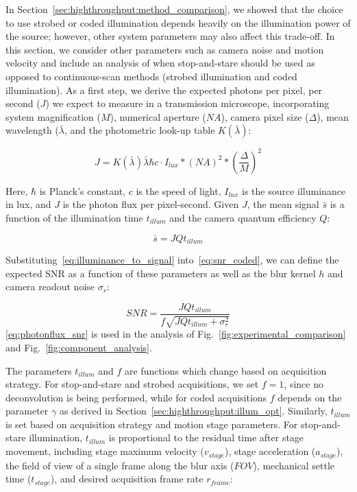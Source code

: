In Section~\ref{sec:highthroughput:method_comparison}, we showed that the choice to use strobed or coded illumination depends heavily on the illumination power of the source; however, other system parameters may also affect this trade-off. In this section, we consider other parameters such as camera noise and motion velocity and include an analysis of when stop-and-stare should be used as opposed to continuous-scan methods (strobed illumination and coded illumination). As a first step, we derive the expected photons per pixel, per second ($J$) we expect to measure in a transmission microscope, incorporating system magnification ($M$), numerical aperture ($NA$), camera pixel size ($\Delta$), mean wavelength ($\bar{\lambda}$, and the photometric look-up table $K(\bar{\lambda})$:

\begin{equation}
\label{eq:photonflux}
J = K(\bar{\lambda}) \bar{\lambda}\hbar c \cdot I_{lux} * (NA)^2 * (\frac{\Delta}{M})^2
\end{equation}

Here, $\hbar$ is Planck's constant, $c$ is the speed of light, $I_{lux}$ is the source illuminance in lux, and $J$ is the photon flux per pixel-second. Given $J$, the mean signal $\bar{s}$ is a function of the illumination time $t_{illum}$ and the camera quantum efficiency $Q$:

\begin{equation}
\label{eq:illuminance_to_signal}
    \bar{s} = J Q t_{illum}
\end{equation}

Substituting~\eqref{eq:illuminance_to_signal} into~\eqref{eq:snr_coded}, we can define the expected SNR as a function of these parameters as well as the blur kernel $h$ and camera readout noise $\sigma_r$:

\begin{equation}
\label{eq:photonflux_snr}
SNR = \frac{J Q t_{illum}}{f \sqrt{J Q t_{illum} + \sigma_r^2}}
\end{equation}
\eqref{eq:photonflux_snr} is used in the analysis of Fig.~\ref{fig:experimental_comparison} and Fig.~\ref{fig:component_analysis}.

The parameters $t_{illum}$ and $f$ are functions which change based on acquisition strategy.
For stop-and-stare and strobed acquisitions, we set $f = 1$, since no deconvolution is being performed, while for coded acquisitions $f$ depends on the parameter $\gamma$ as derived in Section~\ref{sec:highthroughput:illum_opt}.
Similarly, $t_{illum}$ is set based on acquisition strategy and motion stage parameters. For stop-and-stare illumination, $t_{illum}$ is proportional to the residual time after stage movement, including stage maximum velocity ($v_{stage}$), stage acceleration ($a_{stage}$), the field of view of a single frame along the blur axis ($FOV$), mechanical settle time ($t_{stage}$), and desired acquisition frame rate $r_{frame}$:

